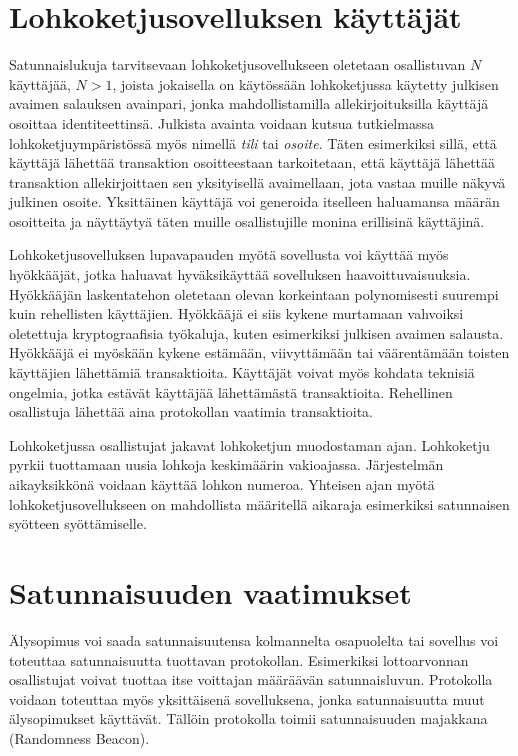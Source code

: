 \section{Lohkoketjusovelluksen käyttäjät}

Satunnaislukuja tarvitsevaan lohkoketjusovellukseen oletetaan osallistuvan $N$ käyttäjää, $N > 1$, joista jokaisella on käytössään lohkoketjussa käytetty julkisen avaimen salauksen avainpari, jonka mahdollistamilla allekirjoituksilla käyttäjä osoittaa identiteettinsä. Julkista avainta voidaan kutsua tutkielmassa lohkoketjuympäristössä myös nimellä \textit{tili} tai \textit{osoite}. Täten esimerkiksi sillä, että käyttäjä lähettää transaktion osoitteestaan tarkoitetaan, että käyttäjä lähettää transaktion allekirjoittaen sen yksityisellä avaimellaan, jota vastaa muille näkyvä julkinen osoite. Yksittäinen käyttäjä voi generoida itselleen haluamansa määrän osoitteita ja näyttäytyä täten muille osallistujille monina erillisinä käyttäjinä.

Lohkoketjusovelluksen lupavapauden myötä sovellusta voi käyttää myös hyökkääjät, jotka haluavat hyväksikäyttää sovelluksen haavoittuvaisuuksia. Hyökkääjän laskentatehon oletetaan olevan korkeintaan polynomisesti suurempi kuin rehellisten käyttäjien. Hyökkääjä ei siis kykene murtamaan vahvoiksi oletettuja kryptograafisia työkaluja, kuten esimerkiksi julkisen avaimen salausta. Hyökkääjä ei myöskään kykene estämään, viivyttämään tai väärentämään toisten käyttäjien lähettämiä transaktioita. Käyttäjät voivat myös kohdata teknisiä ongelmia, jotka estävät käyttäjää lähettämästä transaktioita. Rehellinen osallistuja lähettää aina protokollan vaatimia transaktioita.

Lohkoketjussa osallistujat jakavat lohkoketjun muodostaman ajan. Lohkoketju pyrkii tuottamaan uusia lohkoja keskimäärin vakioajassa. Järjestelmän aikayksikkönä voidaan käyttää lohkon numeroa. Yhteisen ajan myötä lohkoketjusovellukseen on mahdollista määritellä aikaraja esimerkiksi satunnaisen syötteen syöttämiselle.

\section{Satunnaisuuden vaatimukset}\label{vaatimukset}

Älysopimus voi saada satunnaisuutensa kolmannelta osapuolelta tai sovellus voi toteuttaa satunnaisuutta tuottavan protokollan. Esimerkiksi lottoarvonnan osallistujat voivat tuottaa itse voittajan määräävän satunnaisluvun. Protokolla voidaan toteuttaa myös yksittäisenä sovelluksena, jonka satunnaisuutta muut älysopimukset käyttävät. Tällöin protokolla toimii satunnaisuuden majakkana (Randomness Beacon).

